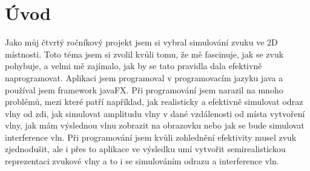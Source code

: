 \section{Úvod}
Jako můj čtvrtý ročníkový projekt jsem si vybral simulování zvuku ve 2D místnosti. Toto téma jsem si zvolil kvůli tomu, že mě fascinuje, jak se zvuk pohybuje, a velmi mě zajímalo, jak by se tato pravidla dala efektivně naprogramovat. Aplikaci jsem programoval v programovacím jazyku java a používal jsem framework javaFX. Při programování jsem narazil na mnoho problémů, mezi které patří například, jak  realisticky a efektivně simulovat odraz vlny od zdi, jak simulovat amplitudu vlny v dané vzdálenosti od místa vytvoření vlny, jak mám výslednou vlnu zobrazit na obrazovku nebo jak se bude simulovat interference vln. Při programování jsem kvůli zohlednění efektivity musel zvuk zjednodušit, ale i přes to  aplikace ve výsledku umí vytvořit semirealistickou reprezentaci zvukové vlny a to i se simulováním odrazu a interference vln. 
